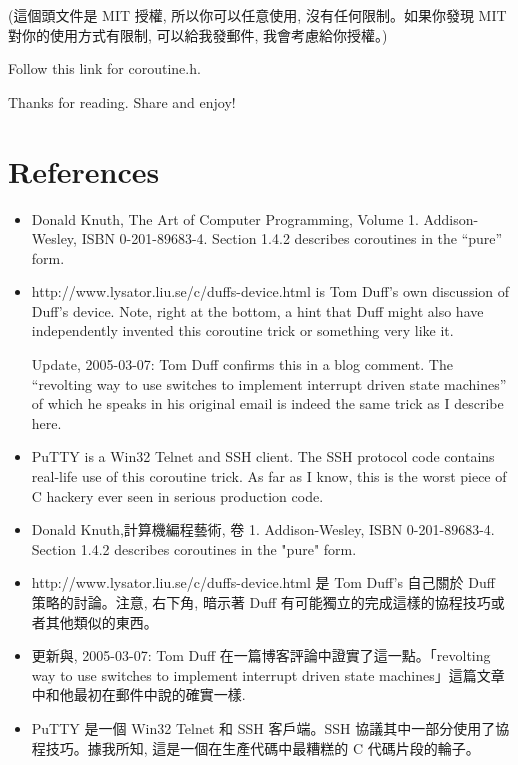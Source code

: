 \documentclass[12pt]{article}
\begin{document}
\begin{CJK}{UTF8}{bsmi}
(這個頭文件是 MIT 授權, 所以你可以任意使用, 沒有任何限制。如果你發現 MIT 對你的使用方式有限制, 可以給我發郵件, 我會考慮給你授權。)

Follow this link for coroutine.h.

%


Thanks for reading. Share and enjoy!

\section{References}

\begin{itemize}
\item Donald Knuth, The Art of Computer Programming, Volume 1. Addison-Wesley, ISBN 0-201-89683-4. Section 1.4.2 describes coroutines in the ``pure'' form.

\item http://www.lysator.liu.se/c/duffs-device.html is Tom Duff's own discussion of Duff's device. Note, right at the bottom, a hint that Duff might also have independently invented this coroutine trick or something very like it.


Update, 2005-03-07: Tom Duff confirms this in a blog comment. The ``revolting way to use switches to implement interrupt driven state machines'' of which he speaks in his original email is indeed the same trick as I describe here.

\item PuTTY is a Win32 Telnet and SSH client. The SSH protocol code contains real-life use of this coroutine trick. As far as I know, this is the worst piece of C hackery ever seen in serious production code. 

\end{itemize}


\begin{itemize}
\item    Donald Knuth,計算機編程藝術, 卷 1. Addison-Wesley, ISBN 0-201-89683-4. Section 1.4.2 describes coroutines in the "pure" form.
\item        http://www.lysator.liu.se/c/duffs-device.html 是 Tom Duff's 自己關於 Duff 策略的討論。注意, 右下角, 暗示著 Duff 有可能獨立的完成這樣的協程技巧或者其他類似的東西。

\item            更新與, 2005-03-07: Tom Duff 在一篇博客評論中證實了這一點。「revolting way to use switches to implement interrupt driven state machines」這篇文章中和他最初在郵件中說的確實一樣.
\item                PuTTY 是一個 Win32 Telnet 和 SSH 客戶端。SSH 協議其中一部分使用了協程技巧。據我所知, 這是一個在生產代碼中最糟糕的
C 代碼片段的輪子。
\end{itemize}





\end{CJK}
\end{document}
